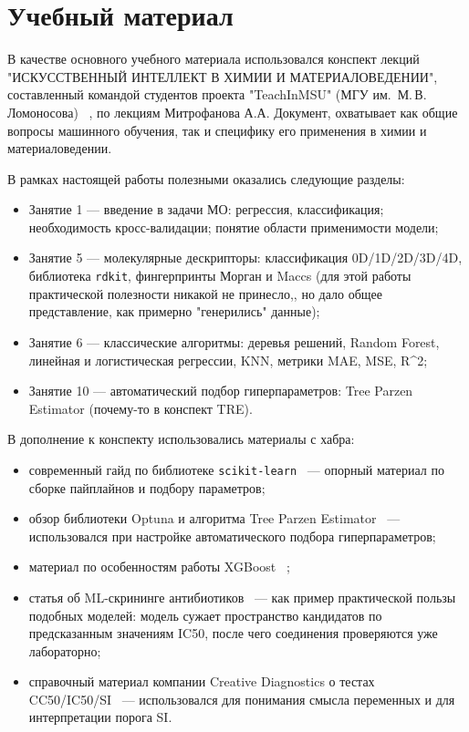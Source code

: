 \documentclass[12pt,a4paper]{report}
\begin{document}
\section{Учебный материал}

В качестве основного учебного материала использовался конспект лекций "ИСКУССТВЕННЫЙ ИНТЕЛЛЕКТ В ХИМИИ И МАТЕРИАЛОВЕДЕНИИ", составленный командой студентов проекта "TeachInMSU" (МГУ им.~М.\,В.\,Ломоносова)~\cite{lectures-msu} , по лекциям Митрофанова А.А. Документ, охватывает как общие вопросы машинного обучения, так и специфику его применения в химии и материаловедении.

В рамках настоящей работы полезными оказались следующие разделы:
\begin{itemize}
    \item Занятие 1 --- введение в задачи МО: регрессия, классификация;  необходимость кросс-валидации; понятие области применимости модели;
    \item Занятие 5 --- молекулярные дескрипторы: классификация 0D/1D/2D/3D/4D, библиотека \texttt{rdkit}, фингерпринты Морган и Maccs (для этой работы практической полезности никакой не принесло,, но дало общее представление, как примерно "генерились" данные);
    \item Занятие 6 --- классические алгоритмы: деревья решений, Random Forest, линейная и логистическая регрессии, KNN, метрики MAE, MSE, R\^{}2;
    \item Занятие 10 --- автоматический подбор гиперпараметров: Tree Parzen Estimator (почему-то в конспект TRE).
\end{itemize}

В дополнение к конспекту использовались материалы с хабра:
\begin{itemize}
    \item современный гайд по библиотеке \texttt{scikit-learn}~\cite{habr-sklearn} ---  опорный материал по сборке пайплайнов и подбору параметров;
    \item обзор библиотеки Optuna и алгоритма Tree Parzen Estimator~\cite{habr-optuna} --- использовался при настройке автоматического подбора гиперпараметров;
    \item материал по особенностям работы XGBoost~\cite{habr-xgboost} ;
    \item статья об ML-скрининге антибиотиков~\cite{habr-mit-antibiotics} --- как пример практической пользы подобных моделей: модель сужает пространство кандидатов по предсказанным значениям IC50, после чего соединения проверяются уже лабораторно;
    \item справочный материал компании Creative Diagnostics о тестах CC50/IC50/SI~\cite{cc50-ic50} --- использовался для понимания смысла переменных и для интерпретации порога SI.
\end{itemize}
\end{document}
